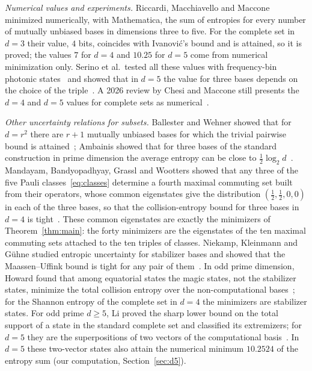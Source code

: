 \documentclass[11pt,a4paper]{article}
\theoremstyle{plain}
\begin{document}
\emph{Numerical values and experiments.} Riccardi, Macchiavello and
Maccone~\cite{RMM2017} minimized numerically, with Mathematica, the sum of
entropies for every number of mutually unbiased bases in dimensions three to
five. For the complete set in $d=3$ their value, $4$ bits, coincides with
Ivanovi\'c's bound and is attained, so it is proved; the values $7$ for $d=4$
and $10.25$ for $d=5$ come from numerical minimization only. Serino et al.\ tested all these values with
frequency-bin photonic states~\cite{Serino2025} and showed that in $d=5$ the
value for three bases depends on the choice of the triple~\cite{Serino2025b}. A
2026 review by Chesi and Maccone still presents the $d=4$ and $d=5$ values for
complete sets as numerical~\cite[Table~1]{CM2026}.

\emph{Other uncertainty relations for subsets.} Ballester and Wehner showed
that for $d=r^2$ there are $r+1$ mutually unbiased bases for which the trivial
pairwise bound is attained~\cite{BW2007}; Ambainis showed that for three bases
of the standard construction in prime dimension the average entropy can be
close to $\frac12\log_2 d$~\cite{Ambainis2009}. Mandayam, Bandyopadhyay, Grassl
and Wootters showed that any three of the five Pauli classes~\eqref{eq:classes}
determine a fourth maximal commuting set built from their operators, whose
common eigenstates give the distribution $(\tfrac12,\tfrac12,0,0)$ in each of
the three bases, so that the collision-entropy bound for three bases in $d=4$ is
tight~\cite[Thm.~1 and Thm.~6]{MBGW2014}. These common eigenstates are exactly
the minimizers of Theorem~\ref{thm:main}: the forty minimizers are the
eigenstates of the ten maximal commuting sets attached to the ten triples of
classes. Niekamp, Kleinmann and G\"uhne studied entropic uncertainty for
stabilizer bases and showed that the Maassen--Uffink bound is tight for any
pair of them~\cite{NKG2012}. In odd prime dimension, Howard found that among
equatorial states the magic states, not the stabilizer states, minimize the
total collision entropy over the non-computational bases~\cite{Howard2015}; for the Shannon entropy of the
complete set in $d=4$ the minimizers are stabilizer states. For odd prime
$d\ge5$, Li proved the sharp lower bound on the total support of a state in the
standard complete set and classified its extremizers; for $d=5$ they are the
superpositions of two vectors of the computational basis~\cite{Li2026}. In $d=5$ these two-vector
states also attain the numerical minimum $10.2524$ of the entropy sum (our
computation, Section~\ref{sec:d5}).
\end{document}
